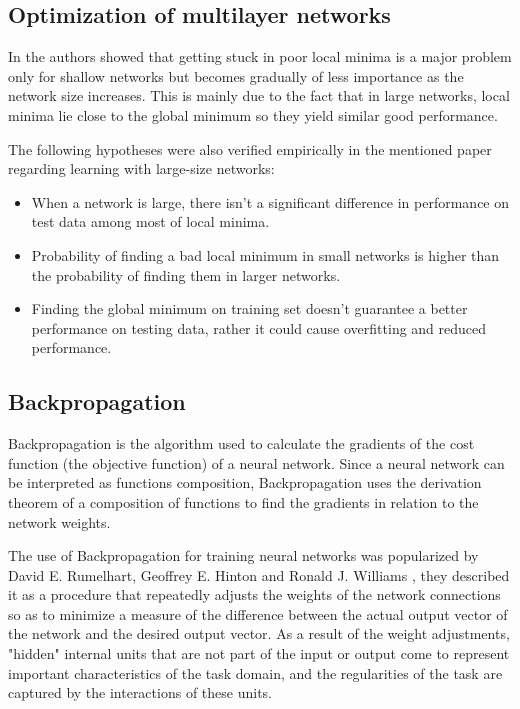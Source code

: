 \subsection{Optimization of multilayer networks}
In  \cite{Choromanska2014} the authors showed that getting stuck in poor local minima is a major problem only for shallow networks but becomes gradually of less importance as the network size increases. This is mainly due to the fact that in large networks, local minima lie close to the global minimum so they yield similar good performance.

The following hypotheses were also verified empirically in the mentioned paper regarding learning with large-size networks:
\begin{itemize}
    \item When a network is large, there isn't a significant difference in performance on test data among most of local minima.
    \item Probability of finding a bad local minimum in small networks is higher than the probability of finding them in larger networks.
    \item Finding the global minimum on training set doesn't guarantee a better performance on testing data, rather it could cause overfitting and reduced performance.
\end{itemize}

\subsection{Backpropagation}
Backpropagation is the algorithm used to calculate the gradients of the cost function (the objective function) of a neural network. Since a neural network can be interpreted as functions composition, Backpropagation uses the derivation theorem of a composition of functions to find the gradients in relation to the network weights.

The use of Backpropagation for training neural networks was popularized by David E. Rumelhart, Geoffrey E. Hinton and Ronald J. Williams \cite{Rumelhart1986}, they described it as a procedure that repeatedly adjusts the weights of the network connections so as to minimize a measure of the difference between the actual output vector of the network and the desired output vector. As a result of the weight adjustments, "hidden" internal units that are not part of the input or output come to represent important characteristics of the task domain, and the regularities of the task are captured by the interactions of these units.

